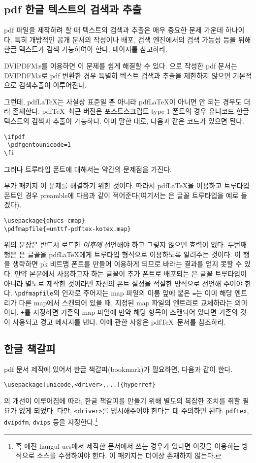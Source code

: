 \subsection{pdf 한글 텍스트의 검색과 추출}
pdf 파일을 제작하려 할 때 텍스트의 검색과 추출은 매우 중요한
문제 가운데 하나이다. 특히 개방적인 공개 문서의 작성이나 배포,
검색 엔진에서의 검색 가능성 등을 위해 한글 텍스트가 검색 가능하여야
한다. 
페이지를 참고하라.

DVIPDFM$x$를 이용하면 이 문제를 쉽게 해결할
수 있다. \kotex 으로 작성한 pdf 문서는 DVIPDFM$x$로 pdf 변환한
경우 특별히 텍스트 검색과 추출을 제한하지 않으면 기본적으로 
검색\cntrdot 추출이 이루어진다.

그런데, pdf\LaTeX 는 사실상 표준일 뿐 아니라 pdf\LaTeX 이
아니면 안 되는 경우도 더러 존재한다. 
pdf\TeX\ 최근 버전은 포스트스크립트 type 1 폰트의 경우
유니코드 한글 텍스트의 검색과 추출이 가능하다. 이미 말한 대로,
다음과 같은 코드가 있으면 된다.
\begin{verbatim}
\ifpdf
 \pdfgentounicode=1
\fi
\end{verbatim}
그러나 트루타입 폰트에 대해서는 약간의 문제점을 가진다.

부가 패키지 \은 
이 문제를 해결하기 위한 것이다. 따라서 pdf\LaTeX 을 이용하고
트루타입 폰트인 경우 preamble에 다음과 같이 적어준다(여기서는
은 글꼴 트루타입을 예로 들겠다).
\begin{verbatim}
\usepackage{dhucs-cmap}
\pdfmapfile{=unttf-pdftex-kotex.map}
\end{verbatim}
위의 문장은 반드시 \thispkg\를 로드한 \emph{이후에} 선언해야 하고
그렇지 않으면 효력이 없다. 
두번째 행은 은 글꼴을 pdf\LaTeX 에게 트루타입 형식으로 이용하도록 알려주는
것이다. 이 행을 생략하면 pk 비트맵 폰트를 만들어 이용하게 되므로 바라는
결과를 얻지 못할 수 있다. 만약 본문에서 사용하고자 하는 글꼴이 \kotex{}
추가 폰트로 배포되는 
은 글꼴 트루타입이 아니라 별도로 제작한 것이라면 자신의 폰트 설정을 적절한 방식으로 선언해 주어야 한다.
\verb|\pdfmapfile|의 인자로 주어지는 map 파일의 이름 앞에 붙은 \verb|=|는
이미 해당 엔트리가 다른 map에서 스캔되어 있을 때, 지정된 map 파일의
엔트리로 교체하라는 의미이다. \verb|+|를 지정하면 기존의 map 파일에
만약 해당 항목이 스캔되어 있다면 기존의 것이 사용되고 경고 메시지를 낸다.
이에 관한 사항은 pdf\TeX\ 문서를 참조하라.

\subsection{한글 책갈피}
pdf 문서 제작에 있어서 한글 책갈피(bookmark)가 필요하면,
다음과 같이 한다.
\begin{verbatim}
\usepackage[unicode,<driver>,...]{hyperref}
\end{verbatim}
의 개선이 이루어짐에 따라, 한글 책갈피를 만들기 위해
별도의 복잡한 조치를 취할 필요가 없게 되었다. 다만, \verb|<driver>|를
명시해주어야 한다는 데 주의하면 된다. \verb|pdftex|, \verb|dvipdfm|,
\verb|dvips| 등을 지정한다.\footnote{%
  혹 예전 hangul-ucs에서 제작한 문서에서 \를
  쓰는 경우가 있다면 이것을 \을 이용하는 방식으로
  소스를 수정하여야 한다. 이 패키지는 더이상 존재하지 않는다.}


